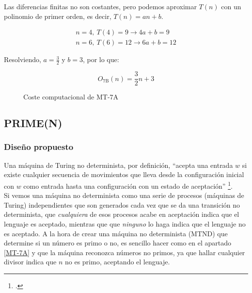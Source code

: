 Las diferencias finitas no son costantes, pero podemos aproximar $T(n)$ con un polinomio de primer orden, es decir, $T(n) = an + b$.\medskip

\begin{subequations}
    \begin{gather*}
        n = 4,\ T(4) = 9  \rightarrow 4a + b = 9 \\
        n = 6,\ T(6) = 12 \rightarrow 6a + b = 12
    \end{gather*}
\end{subequations}


Resolviendo, $a=\frac{3}{2}$ y $b=3$, por lo que:

\begin{equation}
    O_{\mathrm{7B}}(n) = \frac{3}{2}n + 3
\end{equation}


\begin{figure}[H]
    \centering
    
    \caption{Coste computacional de MT-7A}
\end{figure}



\subsection{PRIME(N)}

\subsubsection*{Diseño propuesto}
Una máquina de Turing no determinista, por definición, ``acepta una
entrada $w$ si existe cualquier secuencia de movimientos que lleva desde la configuración inicial con $w$ como entrada hasta una configuración con un estado de aceptación''
\footcite[ver][pg. 289]{HopcroftJohnE.2008Ialt}.\\
Si vemos una máquina no determinista como una serie de procesos (máquinas de Turing) independientes que son generados cada vez que se da una transición no determinista, que \textit{cualquiera} de esos procesos acabe en aceptación indica que el lenguaje es aceptado, mientras que que \textit{ninguno} lo haga indica que el lenguaje no es aceptado. A la hora de crear una máquina no determinista (MTND) que determine si un número es primo o no, es sencillo hacer como en el apartado \ref{MT-7A} y que la máquina reconozca números no primos, ya que hallar cualquier divisor indica que $n$ no es primo, aceptando el lenguaje.\medskip

